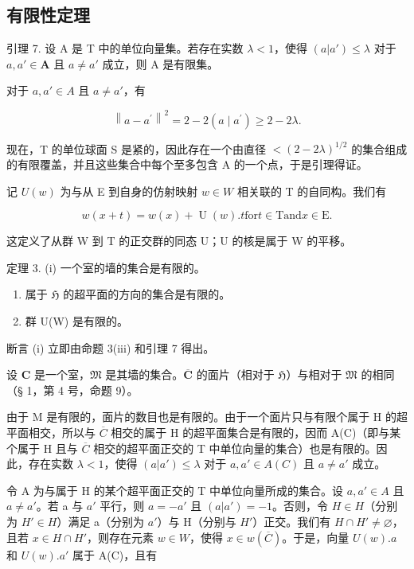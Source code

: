 \subsection{有限性定理}

引理 7. 设 A 是 T 中的单位向量集。若存在实数 \(\lambda < 1\)，使得 \((a|a') \leqslant \lambda\) 对于 \(a, a' \in \mathbf{A}\) 且 \(a \neq a'\) 成立，则 A 是有限集。

对于 \(a, a' \in A\) 且 \(a \neq a'\)，有

\[
\left\| a - a ^ {\prime} \right\| ^ {2} = 2 - 2 (a \mid a ^ {\prime}) \geqslant 2 - 2 \lambda .
\]

现在，T 的单位球面 S 是紧的，因此存在一个由直径 \(<(2-2\lambda)^{1/2}\) 的集合组成的有限覆盖，并且这些集合中每个至多包含 A 的一个点，于是引理得证。

记 \(U(w)\) 为与从 E 到自身的仿射映射 \(w \in W\) 相关联的 T 的自同构。我们有

\[
w (x + t) = w (x) + \operatorname{U} (w). t \text {for} t \in \mathrm{T} \text {and} x \in \mathrm{E}.
\]

这定义了从群 W 到 T 的正交群的同态 U；U 的核是属于 W 的平移。

定理 3. (i) 一个室的墙的集合是有限的。

\begin{enumerate}
\def\labelenumi{(\roman{enumi})}
\setcounter{enumi}{1}
\item
属于 \(\mathfrak{H}\) 的超平面的方向的集合是有限的。
\item
群 U(W) 是有限的。
\end{enumerate}

断言 (i) 立即由命题 3(iii) 和引理 7 得出。

设 \(\mathbf{C}\) 是一个室，\(\mathfrak{M}\) 是其墙的集合。\(\overline{\mathbf{C}}\) 的面片（相对于 \(\mathfrak{H}\)）与相对于 \(\mathfrak{M}\) 的相同（§ 1，第 4 号，命题 9）。

由于 M 是有限的，面片的数目也是有限的。由于一个面片只与有限个属于 H 的超平面相交，所以与 \(\overline{C}\) 相交的属于 H 的超平面集合是有限的，因而 A(C)（即与某个属于 H 且与 \(\overline{C}\) 相交的超平面正交的 T 中单位向量的集合）也是有限的。因此，存在实数 \(\lambda < 1\)，使得 \((a|a') \leqslant \lambda\) 对于 \(a, a' \in A(C)\) 且 \(a \neq a'\) 成立。

令 A 为与属于 H 的某个超平面正交的 T 中单位向量所成的集合。设 \(a, a' \in A\) 且 \(a \neq a'\)。若 a 与 \(a'\) 平行，则 \(a = -a'\) 且 \((a|a') = -1\)。否则，令 \(H \in H\)（分别为 \(H' \in H\)）满足 a（分别为 \(a'\)）与 H（分别与 \(H'\)）正交。我们有 \(H \cap H' \neq \varnothing\)，且若 \(x \in H \cap H'\)，则存在元素 \(w \in W\)，使得 \(x \in w(\overline{C})\)。于是，向量 \(U(w).a\) 和 \(U(w).a'\) 属于 A(C)，且有

